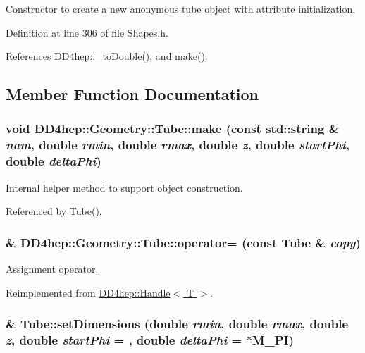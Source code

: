 Constructor to create a new anonymous tube object with attribute initialization. 

Definition at line 306 of file Shapes.h.

References DD4hep::\_\-toDouble(), and make().

\subsection{Member Function Documentation}
\hypertarget{class_d_d4hep_1_1_geometry_1_1_tube_a3ad80b0f21855572872ad3629a577599}{
\subsubsection[{make}]{\setlength{\rightskip}{0pt plus 5cm}void DD4hep::Geometry::Tube::make (const std::string \& {\em nam}, \/  double {\em rmin}, \/  double {\em rmax}, \/  double {\em z}, \/  double {\em startPhi}, \/  double {\em deltaPhi})}}
\label{class_d_d4hep_1_1_geometry_1_1_tube_a3ad80b0f21855572872ad3629a577599}


Internal helper method to support object construction. 

Referenced by Tube().\hypertarget{class_d_d4hep_1_1_geometry_1_1_tube_adcf1ecd48e6edfd48c19492d4b4dd049}{
\subsubsection[{operator=}]{\& DD4hep::Geometry::Tube::operator= (const {\bf Tube} \& {\em copy})}}
\label{class_d_d4hep_1_1_geometry_1_1_tube_adcf1ecd48e6edfd48c19492d4b4dd049}


Assignment operator. 

Reimplemented from \hyperlink{class_d_d4hep_1_1_handle_a9bbf8f498df42e81ad26fb00233505a6}{DD4hep::Handle$<$ T $>$}.\hypertarget{class_d_d4hep_1_1_geometry_1_1_tube_aa1a2e428c08cbd8c7b2e89cc4950a0a1}{
\subsubsection[{setDimensions}]{ \& Tube::setDimensions (double {\em rmin}, \/  double {\em rmax}, \/  double {\em z}, \/  double {\em startPhi} = {}, \/  double {\em deltaPhi} = {$\ast$M\_\-PI})}}
\label{class_d_d4hep_1_1_geometry_1_1_tube_aa1a2e428c08cbd8c7b2e89cc4950a0a1}


